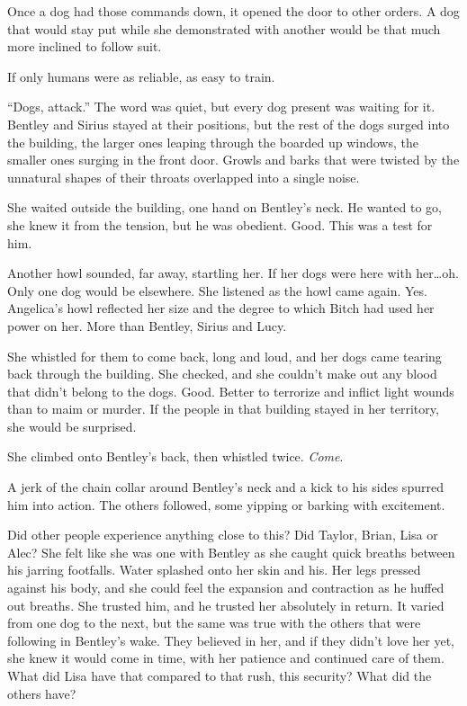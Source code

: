Once a dog had those commands down, it opened the door to other orders.  A dog that would stay put while she demonstrated with another would be that much more inclined to follow suit.



If only humans were as reliable, as easy to train.



``Dogs, attack.''  The word was quiet, but every dog present was waiting for it.  Bentley and Sirius stayed at their positions, but the rest of the dogs surged into the building, the larger ones leaping through the boarded up windows, the smaller ones surging in the front door.  Growls and barks that were twisted by the unnatural shapes of their throats overlapped into a single noise.



She waited outside the building, one hand on Bentley's neck.  He wanted to go, she knew it from the tension, but he was obedient.  Good.  This was a test for him.



Another howl sounded, far away, startling her.  If her dogs were here with her\ldots oh.  Only one dog would be elsewhere.  She listened as the howl came again.  Yes.  Angelica's howl reflected her size and the degree to which Bitch had used her power on her.  More than Bentley, Sirius and Lucy.



She whistled for them to come back, long and loud, and her dogs came tearing back through the building.  She checked, and she couldn't make out any blood that didn't belong to the dogs.  Good.  Better to terrorize and inflict light wounds than to maim or murder.  If the people in that building stayed in her territory, she would be surprised.



She climbed onto Bentley's back, then whistled twice.  \emph{Come}.



A jerk of the chain collar around Bentley's neck and a kick to his sides spurred him into action.  The others followed, some yipping or barking with excitement.



Did other people experience anything close to this?  Did Taylor, Brian, Lisa or Alec?  She felt like she was one with Bentley as she caught quick breaths between his jarring footfalls.  Water splashed onto her skin and his.  Her legs pressed against his body, and she could feel the expansion and contraction as he huffed out breaths.  She trusted him, and he trusted her absolutely in return.  It varied from one dog to the next, but the same was true with the others that were following in Bentley's wake.  They believed in her, and if they didn't love her yet, she knew it would come in time, with her patience and continued care of them. What did Lisa have that compared to that rush, this security?  What did the others have?



